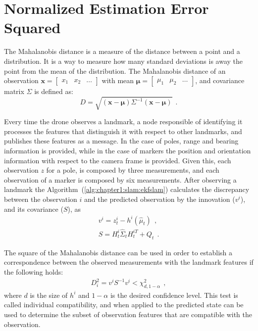 \section{Normalized Estimation Error Squared}
\label{sec:chapter2:nees}
The Mahalanobis distance is a measure of the distance between a point and a distribution. It is a way to measure how many standard deviations is away the point from the mean of the distribution. The Mahalanobis distance of an observation $\bm{x} = \begin{bmatrix}x_1 & x_2 & \dots \end{bmatrix}$ with mean $\bm{\mu} = \begin{bmatrix}\mu_1 & \mu_2 & \dots \end{bmatrix}$, and covariance matrix $\Sigma$ is defined as:
\begin{equation}
    D = \sqrt{\left(\bm{x} - \bm{\mu}\right) \Sigma^{-1} \left(\bm{x} - \bm{\mu}\right)}~~.
    \label{eq:chapter1:nees:mahalanobis}
\end{equation}

Every time the drone observes a landmark, a node responsible of identifying it processes the features that distinguish it with respect to other landmarks, and publishes these features as a message. In the case of poles, range and bearing information is provided, while in the case of markers the position and orientation information with respect to the camera frame is provided. Given this, each observation $z$ for a pole, is composed by three measurements, and each observation of a marker is composed by six measurements. After observing a landmark the Algorithm~(\ref{alg:chapter1:slam:ekfslam}) calculates the discrepancy between the observation $i$ and the predicted observation by the innovation ($v^i$), and its covariance ($S$), as
\begin{align*}
    v^i =  z_t^i - h^i \left( \hat\mu_t \right)~~,\\
    S = H_t^i \hat\Sigma_t H_t^{iT} + Q_t~~.
\end{align*}

The square of the Mahalanobis distance can be used in order to establish a correspondence between the observed measurements with the landmark features if the following holds:
\begin{align}
    D_i^2 = v^i S^{-1} v^i < \chi_{d, 1-\alpha}^2~~,
    \label{eq:chapter2:nees:innov_test}
\end{align}
where $d$ is the size of $h^i$ and $1-\alpha$ is the desired confidence level. This test is called individual compatibility, and when applied to the predicted state can be used to determine the subset of observation features that are compatible with the observation.\\

